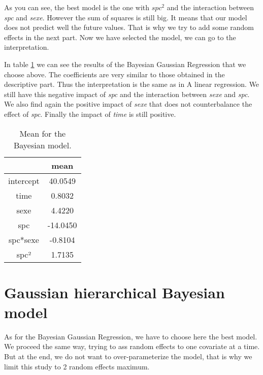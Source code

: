 \documentclass[]{article}
\begin{document}
As you can see, the best model is the one with \emph{\(spc^2\)} and the
interaction between \emph{spc} and \emph{sexe}. However the sum of
squares is still big. It means that our model does not predict well the
future values. That is why we try to add some random effects in the next
part. Now we have selected the model, we can go to the interpretation.

In table \ref{resultsmodel} we can see the results of the Bayesian
Gaussian Regression that we choose above. The coefficients are very
similar to those obtained in the descriptive part. Thus the
interpretation is the same as in \refname{A linear regression}. We still
have this negative impact of \emph{spc} and the interaction between
\emph{sexe} and \emph{spc}. We also find again the positive impact of
\emph{sexe} that does not counterbalance the effect of \emph{spc}.
Finally the impact of \emph{time} is still positive.

\begin{table}[H]
\centering
\begin{tabular}{cc}
  \hline
 & mean \\ 
  \hline
intercept & 40.0549 \\ 
  time & 0.8032 \\ 
  sexe & 4.4220 \\ 
  spc & -14.0450 \\ 
  spc*sexe & -0.8104 \\ 
  spc² & 1.7135 \\ 
   \hline
\end{tabular}
\caption{Mean for the Bayesian model. \label{resultsmodel}} 
\end{table}

\section{Gaussian hierarchical Bayesian
model}\label{gaussian-hierarchical-bayesian-model}

As for the Bayesian Gaussian Regression, we have to choose here the best
model. We proceed the same way, trying to ass random effects to one
covariate at a time. But at the end, we do not want to over-parameterize
the model, that is why we limit this study to 2 random effects maximum.
\end{document}
